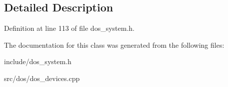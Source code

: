 \subsection{Detailed Description}


Definition at line 113 of file dos\-\_\-system.\-h.



The documentation for this class was generated from the following files\-:\begin{DoxyCompactItemize}
\item 
include/dos\-\_\-system.\-h\item 
src/dos/dos\-\_\-devices.\-cpp\end{DoxyCompactItemize}
